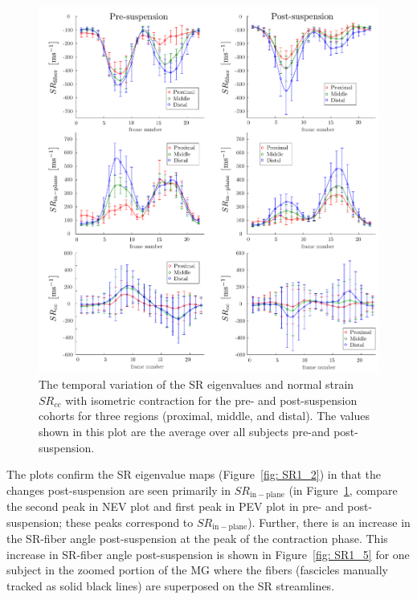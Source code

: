 \begin{figure}[!htb]
\vspace{+0.2cm}
\centering
\includegraphics[width=\textwidth]{Figures/ULLS_SRfiber.pdf}
\caption[The temporal variation of the SR eigenvalues and normal strain $SR_{cc}$ with isometric contraction for the pre- and post-suspension cohorts for three regions]{The temporal variation of the SR eigenvalues and normal strain $SR_{cc}$ with isometric contraction for the pre- and post-suspension cohorts for three regions (proximal, middle, and distal). The values shown in this plot are the average over all subjects pre-and post-suspension.}
\label{fig: SR1_6}
\end{figure}
The plots confirm the SR eigenvalue maps (Figure~\ref{fig: SR1_2}) in that the changes post-suspension are seen primarily in $SR_{\mathrm{in-plane}}$ (in Figure~\ref{fig: SR1_6}, compare the second peak in NEV plot and first peak in PEV plot in pre- and post-suspension; these peaks correspond to $SR_{\mathrm{in-plane}}$). 
 Further, there is an increase in the SR-fiber angle post-suspension at the peak of the contraction phase. 
 This increase in SR-fiber angle post-suspension is shown in Figure~\ref{fig: SR1_5} for one subject in the zoomed portion of the MG where the fibers (fascicles manually tracked as solid black lines) are superposed on the SR streamlines.
